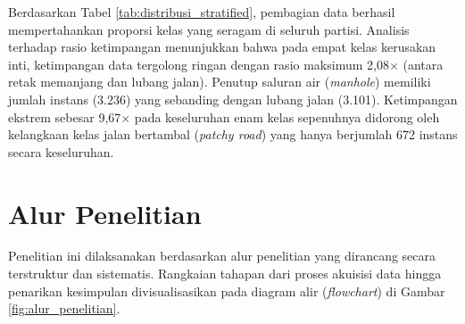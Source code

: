 \begin{table}[H]
	\centering
	\small
	\caption{Distribusi Jumlah Instans Objek per Kelas pada Himpunan Data N-RDD2024}
	\label{tab:distribusi_stratified}
\end{table}

Berdasarkan Tabel \ref{tab:distribusi_stratified}, pembagian data berhasil mempertahankan proporsi kelas yang seragam di seluruh partisi. Analisis terhadap rasio ketimpangan menunjukkan bahwa pada empat kelas kerusakan inti, ketimpangan data tergolong ringan dengan rasio maksimum 2,08$\times$ (antara retak memanjang dan lubang jalan). Penutup saluran air (\textit{manhole}) memiliki jumlah instans (3.236) yang sebanding dengan lubang jalan (3.101). Ketimpangan ekstrem sebesar 9,67$\times$ pada keseluruhan enam kelas sepenuhnya didorong oleh kelangkaan kelas jalan bertambal (\textit{patchy road}) yang hanya berjumlah 672 instans secara keseluruhan.

\section{Alur Penelitian}
Penelitian ini dilaksanakan berdasarkan alur penelitian yang dirancang secara terstruktur dan sistematis. Rangkaian tahapan dari proses akuisisi data hingga penarikan kesimpulan divisualisasikan pada diagram alir (\textit{flowchart}) di Gambar \ref{fig:alur_penelitian}.

